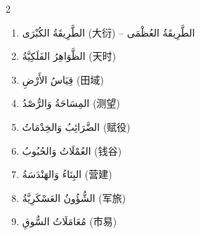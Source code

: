 \documentclass[11pt,a4paper]{article}
\newcommand{\ar}[1]{\arabicfont\beginR #1\endR}
\newenvironment{bilingual}{%
  \begin{paracol}{2}
}{%
  \end{paracol}
}
\begin{document}
\begin{bilingual}
\begin{rightcolumn*}
\begin{enumerate}[label=\arabic*.]
  \item \ar{الطَّرِيقَةُ الكُبْرَى (大衍) -- الطَّرِيقَةُ العُظْمَى}
  \item \ar{الظَّوَاهِرُ الفَلَكِيَّةُ (天时)}
  \item \ar{قِيَاسُ الأَرْضِ (田域)}
  \item \ar{المِسَاحَةُ وَالرُّصْدُ (测望)}
  \item \ar{الضَّرَائِبُ وَالخِدْمَاتُ (赋役)}
  \item \ar{العُمْلَاتُ وَالحُبُوبُ (钱谷)}
  \item \ar{البِنَاءُ وَالهَنْدَسَةُ (营建)}
  \item \ar{الشُّؤُونُ العَسْكَرِيَّةُ (军旅)}
  \item \ar{مُعَامَلَاتُ السُّوقِ (市易)}
\end{enumerate}
\end{rightcolumn*}

\end{bilingual}

\vspace{0.5em}
\end{document}
